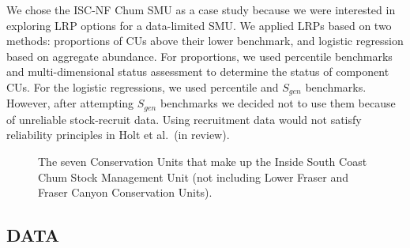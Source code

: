\documentclass[11pt]{book}
\begin{document}
We chose the ISC-NF Chum SMU as a case study because we were interested in exploring LRP options for a data-limited SMU. We applied LRPs based on two methods: proportions of CUs above their lower benchmark, and logistic regression based on aggregate abundance. For proportions, we used percentile benchmarks and multi-dimensional status assessment to determine the status of component CUs. For the logistic regressions, we used percentile and \(S_{gen}\) benchmarks. However, after attempting \(S_{gen}\) benchmarks we decided not to use them because of unreliable stock-recruit data. Using recruitment data would not satisfy reliability principles in Holt et al.~(in review).
\begin{figure}[htb]

{\centering {} 

}

\caption{The seven Conservation Units that make up the Inside South Coast Chum Stock Management Unit (not including Lower Fraser and Fraser Canyon Conservation Units).}\label{fig:chum-map}
\end{figure}
\hypertarget{data-1}{%
\subsection{DATA}\label{data-1}}
\end{document}
